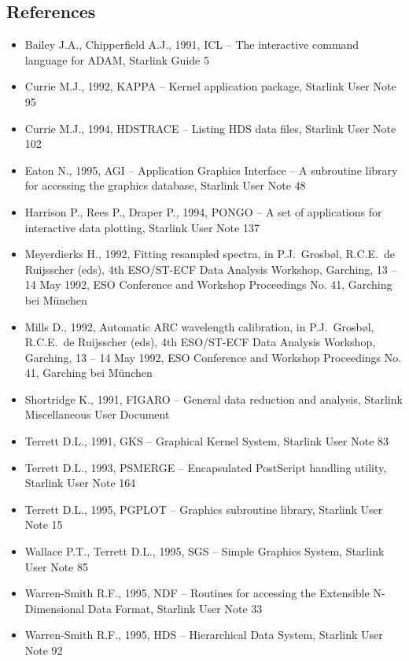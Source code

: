 \documentclass[11pt,twoside]{article}
\newcommand{\xlabel}[1]{}
\begin{document}

\newpage
\subsection{\label{specdrerefs}\xlabel{specdrerefs}References}

\begin{itemize}
\item Bailey J.A., Chipperfield A.J., 1991, ICL -- The interactive
   command language for ADAM, Starlink Guide 5
\item Currie M.J., 1992, KAPPA -- Kernel application package, Starlink
   User Note 95
\item Currie M.J., 1994, HDSTRACE -- Listing HDS data files, Starlink
   User Note 102
\item Eaton N., 1995, AGI -- Application Graphics Interface -- A
   subroutine library for accessing the graphics database, Starlink User
   Note 48
\item Harrison P., Rees P., Draper P., 1994, PONGO -- A set of
   applications for interactive data plotting, Starlink User Note 137
\item Meyerdierks H., 1992, Fitting resampled spectra, in
   P.J.\ Grosb\o l, R.C.E.\ de Ruijsscher (eds), 4th ESO/ST-ECF Data
   Analysis Workshop, Garching, 13 -- 14 May 1992, ESO Conference and
   Workshop Proceedings No. 41, Garching bei M\"unchen
\item Mills D., 1992, Automatic ARC wavelength calibration, in
   P.J.\ Grosb\o l, R.C.E.\ de Ruijsscher (eds), 4th ESO/ST-ECF Data
   Analysis Workshop, Garching, 13 -- 14 May 1992, ESO Conference and
   Workshop Proceedings No. 41, Garching bei M\"unchen
\item Shortridge K., 1991, FIGARO -- General data reduction and
   analysis, Starlink Miscellaneous User Document
\item Terrett D.L., 1991, GKS -- Graphical Kernel System, Starlink
   User Note 83
\item Terrett D.L., 1993, PSMERGE -- Encapsulated PostScript
   handling utility, Starlink User Note 164
\item Terrett D.L., 1995, PGPLOT -- Graphics subroutine library,
   Starlink User Note 15
\item Wallace P.T., Terrett D.L., 1995, SGS -- Simple Graphics System,
   Starlink User Note 85
\item Warren-Smith R.F., 1995, NDF -- Routines for accessing the
   Extensible N-Dimensional Data Format, Starlink User Note 33
\item Warren-Smith R.F., 1995, HDS -- Hierarchical Data System, Starlink
   User Note 92
\end{itemize}
\end{document}
